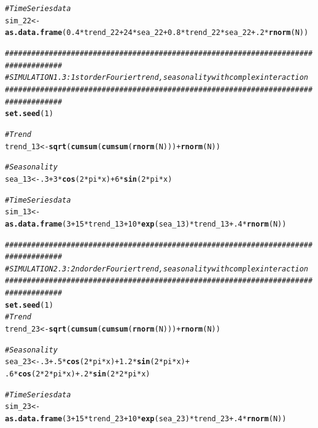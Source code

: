 \documentclass{article}\usepackage[]{graphicx}\usepackage[]{color}
\makeatletter
\newcommand{\hlnum}[1]{\textcolor[rgb]{0.686,0.059,0.569}{#1}}%
\newcommand{\hlcom}[1]{\textcolor[rgb]{0.678,0.584,0.686}{\textit{#1}}}%
\newcommand{\hlopt}[1]{\textcolor[rgb]{0,0,0}{#1}}%
\newcommand{\hlstd}[1]{\textcolor[rgb]{0.345,0.345,0.345}{#1}}%
\newcommand{\hlkwb}[1]{\textcolor[rgb]{0.69,0.353,0.396}{#1}}%
\newcommand{\hlkwd}[1]{\textcolor[rgb]{0.737,0.353,0.396}{\textbf{#1}}}%
\newenvironment{kframe}{%
 \def\at@end@of@kframe{}%
 \ifinner\ifhmode%
  \def\at@end@of@kframe{\end{minipage}}%
  \begin{minipage}{\columnwidth}%
 \fi\fi%
 \def\FrameCommand##1{\hskip\@totalleftmargin \hskip-\fboxsep
 \colorbox{shadecolor}{##1}\hskip-\fboxsep
     \hskip-\linewidth \hskip-\@totalleftmargin \hskip\columnwidth}%
 \MakeFramed {\advance\hsize-\width
   \@totalleftmargin\z@ \linewidth\hsize
   \@setminipage}}%
 {\par\unskip\endMakeFramed%
 \at@end@of@kframe}
\newenvironment{knitrout}{}{} %
\makeatother
\begin{document}
\begin{knitrout}
\begin{kframe}
\begin{alltt}
\hlcom{# Time Series data}
\hlstd{sim_22} \hlkwb{<-} \hlkwd{as.data.frame}\hlstd{(}\hlnum{0.4}\hlopt{*}\hlstd{trend_22} \hlopt{+} \hlnum{24}\hlopt{*}\hlstd{sea_22} \hlopt{+} \hlnum{0.8}\hlopt{*}\hlstd{trend_22}\hlopt{*}\hlstd{sea_22} \hlopt{+} \hlnum{.2}\hlopt{*}\hlkwd{rnorm}\hlstd{(N))}

\hlcom{###################################################################################}
\hlcom{# SIMULATION 1.3: 1st order Fourier trend, seasonality with complex interaction}
\hlcom{###################################################################################}
\hlkwd{set.seed}\hlstd{(}\hlnum{1}\hlstd{)}

\hlcom{# Trend}
\hlstd{trend_13} \hlkwb{<-} \hlkwd{sqrt}\hlstd{(}\hlkwd{cumsum}\hlstd{(}\hlkwd{cumsum}\hlstd{(}\hlkwd{rnorm}\hlstd{(N)))}\hlopt{+}\hlkwd{rnorm}\hlstd{(N))}

\hlcom{# Seasonality}
\hlstd{sea_13} \hlkwb{<-} \hlnum{.3} \hlopt{+} \hlnum{3}\hlopt{*}\hlkwd{cos}\hlstd{(}\hlnum{2}\hlopt{*}\hlstd{pi}\hlopt{*}\hlstd{x)} \hlopt{+} \hlnum{6}\hlopt{*}\hlkwd{sin}\hlstd{(}\hlnum{2}\hlopt{*}\hlstd{pi}\hlopt{*}\hlstd{x)}

\hlcom{# Time Series data}
\hlstd{sim_13} \hlkwb{<-} \hlkwd{as.data.frame}\hlstd{(}\hlnum{3} \hlopt{+} \hlnum{15}\hlopt{*}\hlstd{trend_13} \hlopt{+} \hlnum{10}\hlopt{*}\hlkwd{exp}\hlstd{(sea_13)}\hlopt{*}\hlstd{trend_13} \hlopt{+} \hlnum{.4}\hlopt{*}\hlkwd{rnorm}\hlstd{(N))}



\hlcom{###################################################################################}
\hlcom{# SIMULATION 2.3: 2nd order Fourier trend, seasonality with complex interaction}
\hlcom{###################################################################################}
\hlkwd{set.seed}\hlstd{(}\hlnum{1}\hlstd{)}
\hlcom{# Trend}
\hlstd{trend_23} \hlkwb{<-} \hlkwd{sqrt}\hlstd{(}\hlkwd{cumsum}\hlstd{(}\hlkwd{cumsum}\hlstd{(}\hlkwd{rnorm}\hlstd{(N)))}\hlopt{+}\hlkwd{rnorm}\hlstd{(N))}

\hlcom{# Seasonality}
\hlstd{sea_23} \hlkwb{<-} \hlnum{.3} \hlopt{+} \hlnum{.5}\hlopt{*}\hlkwd{cos}\hlstd{(}\hlnum{2}\hlopt{*}\hlstd{pi}\hlopt{*}\hlstd{x)} \hlopt{+} \hlnum{1.2}\hlopt{*}\hlkwd{sin}\hlstd{(}\hlnum{2}\hlopt{*}\hlstd{pi}\hlopt{*}\hlstd{x)} \hlopt{+}
  \hlnum{.6}\hlopt{*}\hlkwd{cos}\hlstd{(}\hlnum{2}\hlopt{*}\hlnum{2}\hlopt{*}\hlstd{pi}\hlopt{*}\hlstd{x)} \hlopt{+} \hlnum{.2}\hlopt{*}\hlkwd{sin}\hlstd{(}\hlnum{2}\hlopt{*}\hlnum{2}\hlopt{*}\hlstd{pi}\hlopt{*}\hlstd{x)}

\hlcom{# Time Series data}
\hlstd{sim_23} \hlkwb{<-} \hlkwd{as.data.frame}\hlstd{(}\hlnum{3} \hlopt{+} \hlnum{15}\hlopt{*}\hlstd{trend_23} \hlopt{+} \hlnum{10}\hlopt{*}\hlkwd{exp}\hlstd{(sea_23)}\hlopt{*}\hlstd{trend_23} \hlopt{+} \hlnum{.4}\hlopt{*}\hlkwd{rnorm}\hlstd{(N))}
\end{alltt}
\end{kframe}
\end{knitrout}
\end{document}
